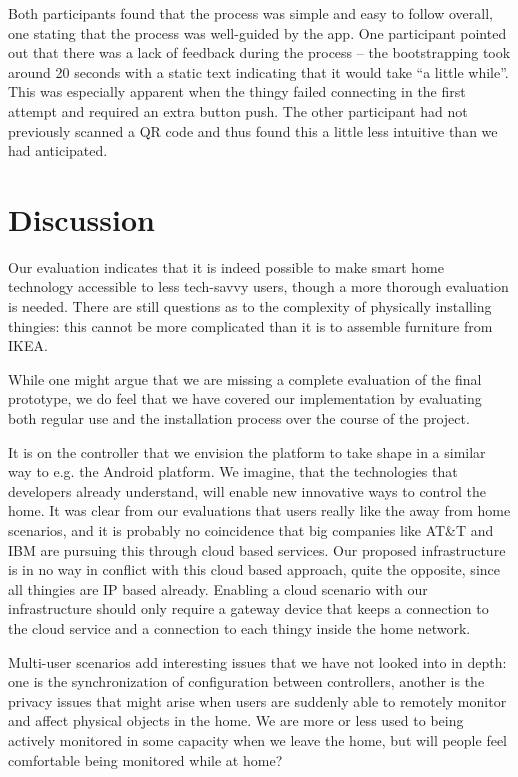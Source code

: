 \documentclass{ubicomp2012}
\begin{document}
Both participants found that the process was simple and easy to follow overall, one stating that the process was well-guided by the app. One participant pointed out that there was a lack of feedback during the process -- the bootstrapping took around 20 seconds with a static text indicating that it would take ``a little while''. This was especially apparent when the thingy failed connecting in the first attempt and required an extra button push. The other participant had not previously scanned a QR code and thus found this a little less intuitive than we had anticipated.

\section{Discussion}

Our evaluation indicates that it is indeed possible to make smart home technology accessible to less tech-savvy users, though a more thorough evaluation is needed. There are still questions as to the complexity of physically installing thingies: this cannot be more complicated than it is to assemble furniture from IKEA.

While one might argue that we are missing a complete evaluation of the final prototype, we do feel that we have covered our implementation by evaluating both regular use and the installation process over the course of the project.

It is on the controller that we envision the platform to take shape in a similar way to e.g. the Android platform. We imagine, that the technologies that developers already understand, will enable new innovative ways to control the home. It was clear from our evaluations that users really like the away from home scenarios, and it is probably no coincidence that big companies like AT\&T and IBM are pursuing this through cloud based services. Our proposed infrastructure is in no way in conflict with this cloud based approach, quite the opposite, since all thingies are IP based already. Enabling a cloud scenario with our infrastructure should only require a gateway device that keeps a connection to the cloud service and a connection to each thingy inside the home network.

Multi-user scenarios add interesting issues that we have not looked into in depth: one is the synchronization of configuration between controllers, another is the privacy issues that might arise when users are suddenly able to remotely monitor and affect physical objects in the home. We are more or less used to being actively monitored in some capacity when we leave the home, but will people feel comfortable being monitored while at home?
\end{document}
